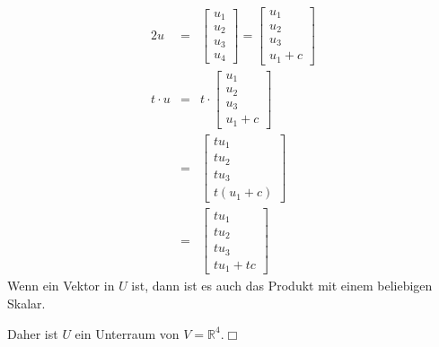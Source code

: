 \documentclass[10pt,a4paper,oneside,ngerman,numbers=noenddot]{scrartcl}
\begin{document}
\begin{alignat*}{2}
u &=& \begin{bmatrix}
u_{1} \\
u_{2} \\
u_{3} \\
u_{4}
\end{bmatrix} =
\begin{bmatrix}
u_{1} \\
u_{2} \\
u_{3} \\
u_{1} + c
\end{bmatrix} \\
t \cdot u &=& t \cdot \begin{bmatrix}
u_{1} \\
u_{2} \\
u_{3} \\
u_{1} + c
\end{bmatrix} \\
&=& \begin{bmatrix}
tu_{1} \\
tu_{2} \\
tu_{3} \\
t(u_{1} + c)
\end{bmatrix} \\
&=& \begin{bmatrix}
tu_{1} \\
tu_{2} \\
tu_{3} \\
tu_{1} + tc
\end{bmatrix}
\end{alignat*}
Wenn ein Vektor in $U$ ist, dann ist es auch das Produkt mit einem beliebigen Skalar.

Daher ist $U$ ein Unterraum von $V = \mathbb{R}^{4}$.\hfill $\Box$
\end{document}
